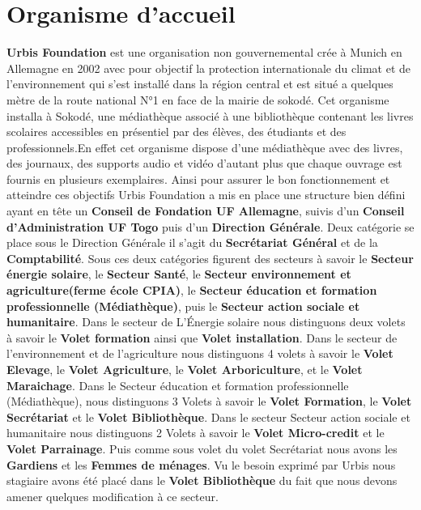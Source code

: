 \documentclass[12pt,a4paper]{article}
\begin{document}
\section{Organisme d'accueil}
\textbf{Urbis Foundation} est une organisation non gouvernemental crée à Munich en Allemagne en 2002 avec pour objectif la protection internationale du climat et de l’environnement qui s'est installé dans la région central et est situé a quelques mètre de la route national N°1 en face de la mairie de sokodé. Cet organisme installa à Sokodé, une médiathèque associé à une bibliothèque contenant les livres scolaires accessibles en présentiel par des élèves, des étudiants et des professionnels.En effet cet organisme dispose d'une médiathèque avec des livres, des journaux, des supports audio et vidéo d'autant plus que chaque ouvrage est fournis en plusieurs exemplaires. Ainsi pour assurer le bon fonctionnement et atteindre ces objectifs Urbis Foundation a mis en place une structure bien défini ayant en tête un \textbf{Conseil de Fondation UF Allemagne}, suivis d'un \textbf{Conseil d’Administration UF Togo} puis d'un \textbf{Direction Générale}. Deux catégorie se place sous le Direction Générale il s'agit du \textbf{Secrétariat Général} et de la \textbf{Comptabilité}. Sous ces deux catégories figurent des secteurs à savoir le \textbf{Secteur énergie solaire}, le \textbf{Secteur Santé}, le \textbf{Secteur environnement et agriculture(ferme école CPIA)}, le \textbf{Secteur éducation et formation professionnelle (Médiathèque)}, puis le \textbf{Secteur action sociale et humanitaire}. Dans le secteur de L’Énergie solaire nous distinguons deux volets à savoir le \textbf{Volet formation} ainsi que \textbf{Volet installation}. Dans le secteur de l'environnement et de l'agriculture nous distinguons 4 volets à savoir le \textbf{Volet Elevage}, le \textbf{Volet Agriculture}, le \textbf{Volet Arboriculture}, et le \textbf{Volet Maraichage}. Dans le Secteur éducation et formation professionnelle (Médiathèque), nous distinguons 3 Volets à savoir le \textbf{Volet Formation}, le \textbf{Volet Secrétariat} et le \textbf{Volet Bibliothèque}. Dans le secteur Secteur action sociale et humanitaire nous distinguons 2 Volets à savoir le \textbf{Volet Micro-credit} et le \textbf{Volet Parrainage}. Puis comme sous volet du volet Secrétariat nous avons les \textbf{Gardiens} et les \textbf{Femmes de ménages}. Vu le besoin exprimé par Urbis nous stagiaire avons été placé dans le \textbf{Volet Bibliothèque} du fait que nous devons amener quelques modification à ce secteur.\\
\end{document}
